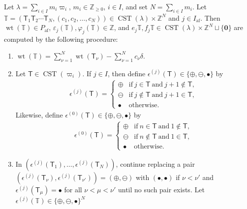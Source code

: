 \documentclass[ALCO,ThmDefs,Unicode,epreuves]{cedram}
\newcommand{\BZ}{\mathbb{Z}}
\newcommand\bm[1]{\boldsymbol{#1}}
\DeclareMathOperator{\af}{af}
\DeclareMathOperator{\wt}{wt}
\DeclareMathOperator{\CST}{CST}
\begin{document}
\begin{prop} \label{prop:crystal-str-SiYT}
Let 
$\lambda = \sum_{i \in I} m_i \varpi_i$, 
$m_i \in \BZ_{\geq 0}$, $i \in I$, 
and set 
$N = \sum_{i \in I} m_i$.
Let 
$\mathbb{T} = (\mathsf{T}_1 \mathsf{T}_2 \cdots \mathsf{T}_N , (c_1 , c_2 , \ldots , c_N)) 
\in \CST (\lambda) \times \BZ^N$ 
and 
$j \in I_{\af}$. 
Then 
$\wt (\mathbb{T}) \in P_{\af}$, 
$\varepsilon_j(\mathbb{T}) , \varphi_j(\mathbb{T}) \in \BZ$, and 
$e_j \mathbb{T} , f_j \mathbb{T} \in \CST (\lambda) \times \BZ^N \sqcup \{ \bm{0} \}$
are computed by the following procedure: 
\begin{enumerate}[label=(\roman*)]
\item
$\wt (\mathbb{T}) = \sum_{\nu = 1}^N \wt (\mathsf{T}_{\nu}) - \sum_{\nu = 1}^N c_{\nu} \delta$. 
\item
Let
$\mathsf{T} \in \CST (\varpi_i)$. 
If $j \in I$, then define 
$\epsilon^{(j)}(\mathsf{T}) \in \{ \bm{\oplus}, \bm{\ominus}, \bullet \}$ 
by 
\begin{align}
\epsilon^{(j)}(\mathsf{T})
=
\begin{cases}
\bm{\oplus} & \text{if} \ j \in \mathsf{T} \ \text{and} \ j+1 \notin \mathsf{T}, \\
\bm{\ominus} & \text{if} \ j \notin \mathsf{T} \ \text{and} \ j+1 \in \mathsf{T}, \\
\bullet & \text{otherwise}.
\end{cases}
\end{align}
Likewise, define
$\epsilon^{(0)}(\mathsf{T}) \in \{ \bm{\oplus}, \bm{\ominus}, \bullet \}$ 
by 
\begin{align}
\epsilon^{(0)}(\mathsf{T})
=
\begin{cases}
\bm{\oplus} & \text{if} \ n \in \mathsf{T} \ \text{and} \ 1 \notin \mathsf{T}, \\
\bm{\ominus} & \text{if} \ n \notin \mathsf{T} \ \text{and} \ 1 \in \mathsf{T}, \\
\bullet & \text{otherwise}.
\end{cases}
\end{align}
\item
In 
$\left( \epsilon^{(j)}(\mathsf{T}_1) , \ldots , \epsilon^{(j)}(\mathsf{T}_N) \right)$, 
continue replacing a pair 
$\left( \epsilon^{(j)}(\mathsf{T}_{\nu}) , \epsilon^{(j)}(\mathsf{T}_{\nu'}) \right) = (\bm{\oplus},\bm{\ominus})$ 
with 
$(\bullet , \bullet)$ 
if 
$\nu < \nu'$ 
and 
$\epsilon^{(j)}(\mathsf{T}_{\mu}) = \bullet$ 
for all 
$\nu < \mu < \nu'$ 
until no such pair exists. 
Let 
$\epsilon^{(j)}(\mathbb{T}) \in \{ \bm{\oplus},\bm{\ominus}, \bullet \}^N$

\end{enumerate}
\end{prop}
\end{document}
